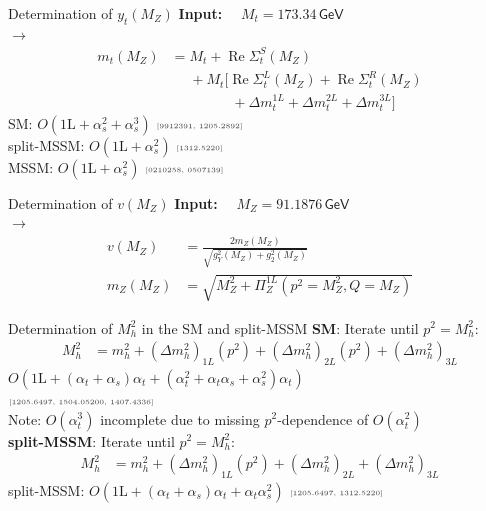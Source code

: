 \documentclass[hyperref={pdfpagelabels=false},ngerman]{beamer}
\newcommand{\eh}[1]{\,\mathsf{#1}}
\newcommand{\mycite}[1]{\ensuremath{\text{\textcolor{darkgray}{\tiny [#1]}}}}
\DeclareMathOperator{\re}{Re}
\renewcommand{\emph}{\textbf}
\newcommand{\at}{\alpha_t}
\newcommand{\as}{\alpha_s}
\begin{document}
\begin{frame}[noframenumbering]{Determination of $y_t(M_Z)$}
  \emph{Input:} \ \ $M_t = 173.34\eh{GeV}$\\[1em]
  $\rightarrow$
  \begin{align*}
    m_{t}(M_Z) &= M_t +
    \re\Sigma_{t}^{S}(M_Z) \\
    &\phantom{={}} + M_t \Big[ \re\Sigma_{t}^{L}(M_Z) +
    \re\Sigma_{t}^{R}(M_Z) \\
    &\phantom{={}} \qquad\quad
      + \Delta m_t^{1L} + \Delta m_t^{2L} + \Delta m_t^{3L} \Big]
  \end{align*}
  SM: $O(\text{1L} + \as^2 + \as^3)$ \mycite{9912391, 1205.2892} \\
  split-MSSM: $O(\text{1L} + \as^2)$ \mycite{1312.5220}\\
  MSSM: $O(\text{1L} + \as^2)$ \mycite{0210258, 0507139}
\end{frame}

\begin{frame}[noframenumbering]{Determination of $v(M_Z)$}
  \emph{Input:} \ \ $M_Z = 91.1876\eh{GeV}$\\[1em]
  $\rightarrow$
  \begin{align*}
    v(M_Z) &= \frac{2 m_Z(M_Z)}{\sqrt{g_Y^2(M_Z) + g_2^2(M_Z)}} \\
    m_Z(M_Z) &= \sqrt{M_Z^2 + \Pi_Z^{1L}(p^2=M_Z^2,Q=M_Z)}
  \end{align*}
\end{frame}

\begin{frame}[noframenumbering]{Determination of $M_h^2$ in the SM and split-MSSM}
  \emph{SM}:
  Iterate until $p^2 = M_h^2$:
  \begin{align*}
    M_h^2 &= m_h^2 + (\Delta m_h^2)_{1L}(p^2)
            + (\Delta m_h^2)_{2L}(p^2) +(\Delta m_h^2)_{3L}
  \end{align*}
  $O(\text{1L} + (\at+\as)\at + (\at^2 + \at\as + \as^2)\at)$\\
  \mycite{1205.6497, 1504.05200, 1407.4336}\\
  Note: $O(\at^3)$ incomplete due to missing $p^2$-dependence of $O(\at^2)$
  \\[2em]
  \emph{split-MSSM}:
  Iterate until $p^2 = M_h^2$:
  \begin{align*}
    M_h^2 &= m_h^2 + (\Delta m_h^2)_{1L}(p^2)
            + (\Delta m_h^2)_{2L} +(\Delta m_h^2)_{3L}
  \end{align*}
  split-MSSM: $O(\text{1L} + (\at+\as)\at + \at\as^2)$
  \mycite{1205.6497, 1312.5220}
\end{frame}
\end{document}
